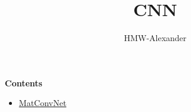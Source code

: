 \documentclass[letterpaper,11pt]{article}
\title{\textbf{CNN}}
\author{HMW-Alexander}
\begin{document}
\maketitle

\textbf{Contents}
\begin{itemize}
	\item \href{./MatConvNet/document.html}{MatConvNet}
\end{itemize}
	
\end{document}
